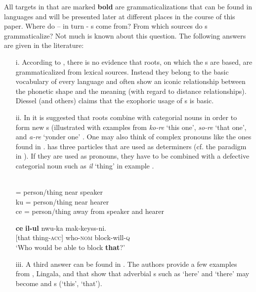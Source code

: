 \documentclass[output=paper]{langsci/langscibook}
\begin{document}
All targets in  that are marked \textbf{bold} are grammaticalizations that can be found in  languages and will be presented later at different places in the course of this paper. Where do – in turn - s come from? From which sources do s grammaticalize? Not much is known about this question. The following answers are given in the literature:

\begin{enumerate}
\item[i.]
According to \citet[154]{Diessel1999}, there is no evidence that  roots, on which the s are based, are grammaticalized from lexical sources. Instead they belong to the basic vocabulary of every language and often show an iconic relationship between the phonetic shape and the meaning (with regard to distance relationships). Diessel (and others) claims that the exophoric usage of s is basic.

\item[ii.]
In \citet[37--38]{Lehmann1995[1982]} it is suggested that  roots combine with categorial nouns in order to form new s (illustrated with examples from  \textit{ko-re} `this one', \textit{so-re} `that one', and \textit{a-re} `yonder one' \citep[38]{Lehmann1995[1982]}. One may also think of complex  pronouns like the ones found in .  has three  particles that are used as determiners (cf. the paradigm in ). If they are used as  pronouns, they have to be combined with a defective categorial noun such as \textit{il} `thing' in example . 


\newpage
\ea\label{ex:helmbrecht:1}\let\eachwordone=\upshape
{} \citep[295]{Sohn1999}\\
 = {person/thing near speaker}\\
{ku} =      {person/thing near hearer}\\
{ce} =      {person/thing away from speaker and hearer}\\
\z

\ea \label{ex:helmbrecht:2}
 \citep[295]{Sohn1999}

\gll {\ob}\textbf{ce} \textbf{il-ul}{\cb}       nwu-ka       mak-keyss-ni.\\
{}[that thing-\textsc{acc}]   who-\textsc{nom}  block-will-\textsc{q}\\
\glt ‘Who would be able to block \textbf{that}?’ 
\z

\item[iii.]
A third answer can be found in \citet[172/294]{Heine2002}. The authors provide a few examples from , Lingala, and  that show that adverbial s such as `here' and `there' may become  and  s (`this', `that').
\end{enumerate}
\end{document}
